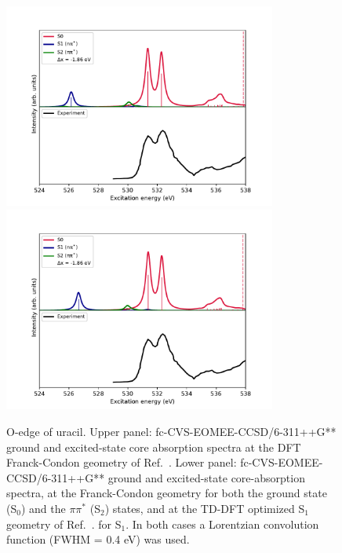 \documentclass[journal=jctcce,manuscript=article]{achemso}
\begin{document}
\begin{figure}[H]
\includegraphics[width=0.8\textwidth]{Spectra/Uracil_Sn_O.pdf}\\
\vspace{-0.2cm}\includegraphics[width=0.8\textwidth]{Spectra/S1opt_Uracil_Sn_O.pdf}
\caption{O-edge of uracil. Upper panel: fc-CVS-EOMEE-CCSD/6-311++G** ground and excited-state core absorption spectra at the DFT Franck-Condon geometry of 
Ref.~.
Lower panel: fc-CVS-EOMEE-CCSD/6-311++G** ground and excited-state core-absorption spectra, at the Franck-Condon geometry for both the ground state (S$_0$) and the $\pi\pi^*$ (S$_2$) states, and at the TD-DFT optimized S$_1$ geometry of 
Ref.~.
for S$_1$. 
In both cases a Lorentzian convolution function (FWHM = 0.4 eV) was used.
\label{fgr:uracil:trnexafs_uracil_o:DFT}}
\end{figure}
\end{document}

